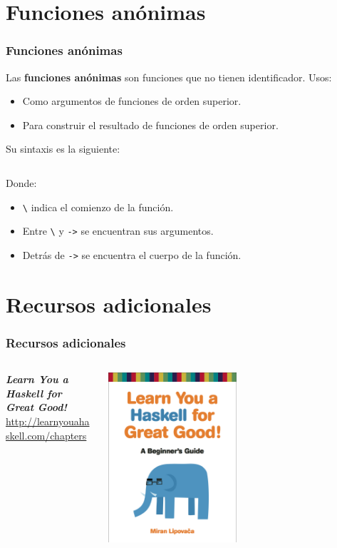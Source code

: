 \section{Funciones anónimas}
\begin{frame}
  \frametitle{Funciones anónimas}
  Las \textbf{funciones anónimas} son funciones que no tienen identificador. Usos:
  \begin{itemize}
  \item Como argumentos de funciones de orden superior.
  \item Para construir el resultado de funciones de orden superior.
  \end{itemize}
  Su sintaxis es la siguiente:
  \inputminted[bgcolor=bg]{haskell}{code/anon.hs}
  Donde:
  \begin{itemize}
  \item \texttt{\textbackslash} indica el comienzo de la función.
  \item Entre \texttt{\textbackslash} y \texttt{->} se encuentran sus argumentos.
  \item Detrás de \texttt{->} se encuentra el cuerpo de la función.
  \end{itemize}
\end{frame}

\section{Recursos adicionales}
\begin{frame}
  \frametitle{Recursos adicionales}
  \begin{columns}
    \begin{column}{0.5\textwidth}
      \textbf{\textit{Learn You a Haskell for Great Good!}}\\
      \url{http://learnyouahaskell.com/chapters}
    \end{column}
    \begin{column}{0.5\textwidth}  %
      \begin{center}
        \includegraphics[width=0.5\textwidth]{img/LYH.png}
      \end{center}
    \end{column}
  \end{columns}
\end{frame}
